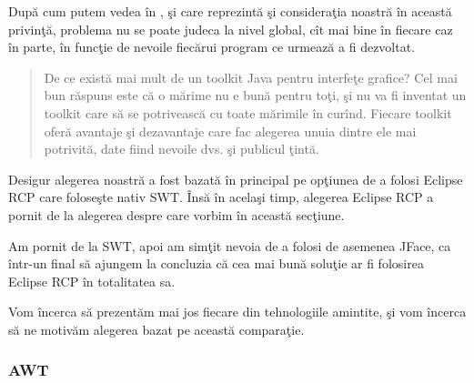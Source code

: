 După cum putem vedea în \cite{swtawtswing}, şi care reprezintă şi consideraţia
noastră în această privinţă, problema nu se poate judeca la nivel global, cît
mai bine în fiecare caz în parte, în funcţie de nevoile fiecărui program ce
urmează a fi dezvoltat.

\begin{quotation}
De ce există mai mult de un toolkit Java pentru interfeţe grafice? Cel mai bun 
răspuns este că o mărime nu e bună pentru toţi, şi nu va fi inventat un toolkit 
care să se potrivească cu toate mărimile în curînd. Fiecare toolkit oferă 
avantaje şi dezavantaje care fac alegerea unuia dintre ele mai potrivită, date 
fiind nevoile dvs. şi publicul ţintă. \cite{swtawtswing}
\end{quotation}

Desigur alegerea noastră a fost bazată în principal pe opţiunea de a folosi 
Eclipse RCP care foloseşte nativ SWT. Însă în acelaşi timp, alegerea Eclipse 
RCP a pornit de la alegerea despre care vorbim în această secţiune.

Am pornit de la SWT, apoi am simţit nevoia de a folosi de asemenea JFace, ca
într-un final să ajungem la concluzia că cea mai bună soluţie ar fi folosirea
Eclipse RCP în totalitatea sa.

Vom încerca să prezentăm mai jos fiecare din tehnologiile amintite, şi vom
încerca să ne motivăm alegerea bazat pe această comparaţie.

\subsubsection{AWT}

